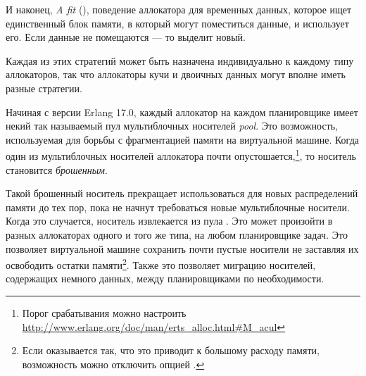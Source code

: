 \documentclass[11pt, oneside]{book}   	%
\begin{document}
И наконец, \emph{A fit} (), поведение аллокатора для временных данных, которое ищет единственный блок памяти, в который могут поместиться данные, и использует его. Если данные не помещаются --- то  выделит новый.

Каждая из этих стратегий может быть назначена индивидуально к каждому типу аллокаторов, так что аллокаторы кучи и двоичных данных могут вполне иметь разные стратегии.

Начиная с версии Erlang 17.0, каждый аллокатор  на каждом планировщике имеет некий так называемый пул мультиблочных носителей \emph{ pool}. Это возможность, используемая для борьбы с фрагментацией памяти на виртуальной машине. Когда один из мультиблочных носителей аллокатора почти опустошается,\footnote{Порог срабатывания можно настроить \href{http://www.erlang.org/doc/man/erts\_alloc.html\#M\_acul}{http://www.erlang.org/doc/man/erts\_alloc.html\#M\_acul}}, то носитель становится \emph{брошенным}.

Такой брошенный носитель прекращает использоваться для новых распределений памяти до тех пор, пока не начнут требоваться новые мультиблочные носители. Когда это случается, носитель извлекается из пула . Это может произойти в разных аллокаторах  одного и того же типа, на любом планировщике задач. Это позволяет виртуальной машине сохранить почти пустые носители не заставляя их освободить остатки памяти\footnote{Если оказывается так, что это приводит к большому расходу памяти, возможность можно отключить опцией .}. Также это позволяет миграцию носителей, содержащих немного данных, между планировщиками по необходимости.
\end{document}
